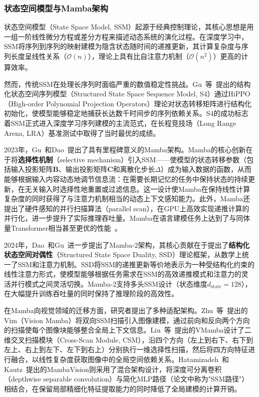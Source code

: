 \documentclass[12pt,a4paper]{article}
\numberwithin{equation}{section}
\numberwithin{figure}{section}
\numberwithin{table}{section}
\begin{document}
\subsubsection{状态空间模型与Mamba架构}

状态空间模型（State Space Model, SSM）起源于经典控制理论，其核心思想是用一组一阶线性微分方程或差分方程来描述动态系统的演化过程。在深度学习中，SSM将序列到序列的映射建模为隐含状态随时间的递推更新，其计算复杂度与序列长度呈线性关系（$\mathcal{O}(n)$），理论上具有比自注意力机制（$\mathcal{O}(n^2)$）更高的计算效率。

然而，传统SSM在处理长序列时面临严重的数值稳定性挑战。Gu~等~\cite{gu2022s4}提出的结构化状态空间序列模型（Structured State Space Sequence Model, S4）通过HiPPO（High-order Polynomial Projection Operators）理论对状态转移矩阵进行结构化初始化，使模型能够稳定地捕获长达数千时间步的序列依赖关系。S4的成功标志着SSM正式进入深度学习序列建模的主流范式，在长程竞技场（Long Range Arena, LRA）基准测试中取得了当时最优的成绩。

2023年，Gu~和Dao~\cite{gu2023mamba}提出了具有里程碑意义的Mamba架构。Mamba的核心创新在于将\textbf{选择性机制}（selective mechanism）引入SSM——使模型的状态转移参数（包括输入投影矩阵$\mathbf{B}$、输出投影矩阵$\mathbf{C}$和离散化步长$\Delta$）成为输入数据的函数，从而能够根据输入内容动态地调节信息流：在需要长期记忆的任务中保持状态的持续更新，在无关输入时选择性地重置或过滤信息。这一设计使Mamba在保持线性计算复杂度的同时获得了与注意力机制相当的动态上下文感知能力。此外，Mamba还提出了硬件感知的并行扫描算法（parallel scan），在GPU上高效实现递推计算的并行化，进一步提升了实际推理吞吐量。Mamba在语言建模任务上达到了与同体量Transformer相当甚至更优的性能~\cite{gu2023mamba}。

2024年，Dao~和Gu~\cite{dao2024mamba2}进一步提出了Mamba-2架构，其核心贡献在于提出了\textbf{结构化状态空间对偶性}（Structured State Space Duality, SSD）理论框架，从数学上统一了SSM和注意力机制。SSD将SSM的递推更新等价地表示为一种受结构化约束的线性注意力形式，使模型能够根据任务需求在SSM的高效递推模式和注意力的灵活并行模式之间灵活切换。Mamba-2支持多头SSM设计（状态维度$d_{\text{state}}=128$），在大幅提升训练吞吐量的同时保持了推理阶段的高效性。

在Mamba向视觉领域的迁移方面，研究者提出了多种适配架构。Zhu~等~\cite{zhu2024vim}提出的Vim（Vision Mamba）将双向SSM扫描引入图像建模，通过前向和反向两个方向的扫描使每个图像块能够整合全局上下文信息。Liu~等~\cite{liu2024vmamba}提出的VMamba设计了二维交叉扫描模块（Cross-Scan Module, CSM），沿四个方向（左上到右下、右下到左上、右上到左下、左下到右上）分别执行一维选择性扫描，然后将四方向特征进行融合，以线性复杂度获取图像中的全局空间依赖关系。Hatamizadeh~和Kautz~\cite{hatamizadeh2024mambavision}提出的MambaVision则采用了混合架构设计，将深度可分离卷积（depthwise separable convolution）与简化MLP路径（论文中称为"SSM路径"）相结合，在保留局部精细化特征提取能力的同时降低了全局建模的计算开销。
\end{document}
